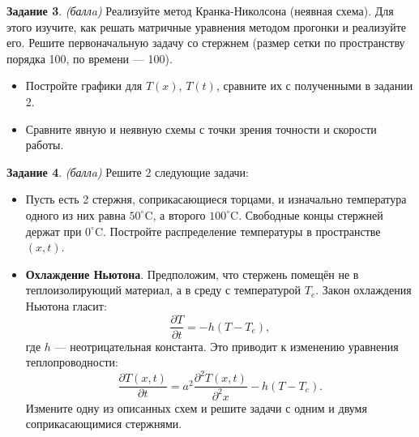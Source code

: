 \documentclass[12pt]{article}
\newcommand{\task}[2]{\vspace{6pt}
\textbf{Задание #1}. #2 %
}
\begin{document}
\task{3}{\textit{(баллa)}} Реализуйте метод Кранка-Николсона (неявная схема). Для этого изучите, как решать матричные уравнения методом прогонки и реализуйте его. Решите первоначальную задачу со стержнем (размер сетки по пространству порядка 100, по времени --- 100).
\begin{itemize}
\item Постройте графики для $T(x)$, $T(t)$, сравните их с полученными в задании 2.
\item Сравните явную и неявную схемы с точки зрения точности и скорости работы.
\end{itemize}

\task{4}{\textit{(баллa)}} Решите 2 следующие задачи:
\begin{itemize}
\item Пусть есть 2 стержня, соприкасающиеся торцами, и изначально температура одного из них равна $50^\circ \mathrm{C}$, а второго $100^\circ \mathrm{C}$. Свободные концы стержней держат при $0^\circ \mathrm{C}$. Постройте распределение температуры в пространстве $(x,t)$.
\item \textbf{Охлаждение Ньютона}. Предположим, что стержень помещён не в теплоизолирующий материал, а в среду с температурой $T_e$. Закон охлаждения Ньютона гласит:
\[\frac{\partial T}{\partial t}=-h(T-T_e),\]
где $h$ --- неотрицательная константа. Это приводит к изменению уравнения теплопроводности:
\[\frac{\partial T(x, t)}{\partial t}=a^2\frac{\partial^2 T(x, t)}{\partial^2 x}-h(T-T_e).\]
Измените одну из описанных схем и решите задачи с одним и двумя соприкасающимися стержнями.
\end{itemize}
\end{document}
